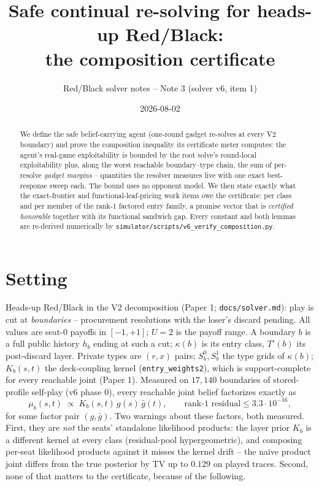 \documentclass[11pt]{article}
\title{Safe continual re-solving for heads-up Red/Black:\\
the composition certificate}
\author{Red/Black solver notes -- Note 3 (solver v6, item 1)}
\date{2026-08-02}
\theoremstyle{plain}
\theoremstyle{definition}
\theoremstyle{remark}
\begin{document}
\maketitle

\begin{abstract}
\noindent
We define the safe belief-carrying agent (one-round gadget re-solves at
every V2 boundary) and prove the composition inequality its certificate
meter computes: the agent's real-game exploitability is bounded by the
root solve's round-local exploitability plus, along the worst reachable
boundary--type chain, the sum of per-resolve \emph{gadget margins} --
quantities the resolver measures live with one exact best-response
sweep each. The bound uses no opponent model. We then state exactly
what the exact-frontier and functional-leaf-pricing work items owe the
certificate: per class and per member of the rank-1 factored entry
family, a promise vector that is \emph{certified honorable} together
with its functional sandwich gap. Every constant and both lemmas are
re-derived numerically by \texttt{simulator/scripts/v6\_verify\_composition.py}.
\end{abstract}

\section{Setting}

Heads-up Red/Black in the V2 decomposition (Paper 1;
\texttt{docs/solver.md}): play is cut at \emph{boundaries} -- procurement
resolutions with the loser's discard pending. All values are seat-0
payoffs in $[-1,+1]$; $U=2$ is the payoff range. A boundary $b$ is a
full public history $h_b$ ending at such a cut; $\kappa(b)$ is its
entry class, $T'(b)$ its post-discard layer. Private types are
$(r,x)$ pairs; $S^0_b, S^1_b$ the type grids of $\kappa(b)$;
$K_b(s,t)$ the deck-coupling kernel (\texttt{entry\_weights2}), which
is support-complete for every reachable joint (Paper 1). Measured on
$17{,}140$ boundaries of stored-profile self-play (v6 phase 0), every
reachable joint belief factorizes exactly as
\[
\mu_b(s,t) \;\propto\; K_b(s,t)\, g(s)\, \bar g(t),
\qquad \text{rank-1 residual} \le 3.3\cdot10^{-16},
\]
for some factor pair $(g, \bar g)$. Two warnings about these factors,
both measured. First, they are \emph{not} the seats' standalone
likelihood products: the layer prior $K_b$ is a different kernel at
every class (residual-pool hypergeometric), and composing per-seat
likelihood products against it misses the kernel drift -- the naive
product joint differs from the true posterior by TV up to $0.129$ on
played traces. Second, none of that matters to the certificate,
because of the following.
\end{document}
